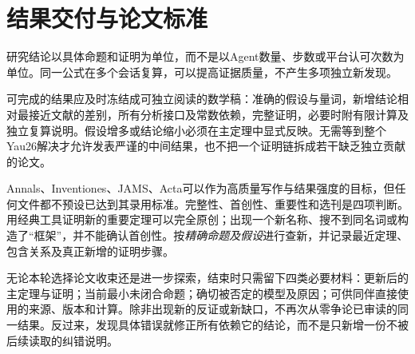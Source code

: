 \documentclass[UTF8,a4paper,11pt,fontset=fandol]{ctexart}
\numberwithin{equation}{section}
\theoremstyle{definition}
\begin{document}
\section{结果交付与论文标准}
研究结论以具体命题和证明为单位，而不是以Agent数量、步数或平台认可次数为单位。同一公式在多个会话复算，可以提高证据质量，不产生多项独立新发现。

可完成的结果应及时冻结成可独立阅读的数学稿：准确的假设与量词，新增结论相对最接近文献的差别，所有分析接口及常数依赖，完整证明，必要时附有限计算及独立复算说明。假设增多或结论缩小必须在主定理中显式反映。无需等到整个Yau26解决才允许发表严谨的中间结果，也不把一个证明链拆成若干缺乏独立贡献的论文。

Annals、Inventiones、JAMS、Acta可以作为高质量写作与结果强度的目标，但任何文件都不预设已达到其录用标准。完整性、首创性、重要性和选刊是四项判断。用经典工具证明新的重要定理可以完全原创；出现一个新名称、搜不到同名词或构造了“框架”，并不能确认首创性。按\emph{精确命题及假设}进行查新，并记录最近定理、包含关系及真正新增的证明步骤。

无论本轮选择论文收束还是进一步探索，结束时只需留下四类必要材料：更新后的主定理与证明；当前最小未闭合命题；确切被否定的模型及原因；可供同伴直接使用的来源、版本和计算。除非出现新的反证或新缺口，不再次从零争论已审读的同一结果。反过来，发现具体错误就修正所有依赖它的结论，而不是只新增一份不被后续读取的纠错说明。
\end{document}
